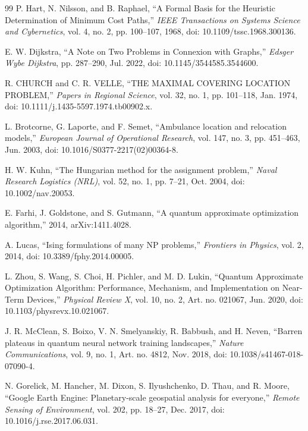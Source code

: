 \documentclass[10pt,twocolumn]{article}
\begin{document}
{\begin{thebibliography}{99}
P. Hart, N. Nilsson, and B. Raphael, ``A Formal Basis for the Heuristic Determination of Minimum Cost Paths,'' \emph{IEEE Transactions on Systems Science and Cybernetics}, vol. 4, no. 2, pp. 100--107, 1968, doi: 10.1109/tssc.1968.300136.

E. W. Dijkstra, ``A Note on Two Problems in Connexion with Graphs,'' \emph{Edsger Wybe Dijkstra}, pp. 287--290, Jul. 2022, doi: 10.1145/3544585.3544600.

R. CHURCH and C. R. VELLE, ``THE MAXIMAL COVERING LOCATION PROBLEM,'' \emph{Papers in Regional Science}, vol. 32, no. 1, pp. 101--118, Jan. 1974, doi: 10.1111/j.1435-5597.1974.tb00902.x.

L. Brotcorne, G. Laporte, and F. Semet, ``Ambulance location and relocation models,'' \emph{European Journal of Operational Research}, vol. 147, no. 3, pp. 451--463, Jun. 2003, doi: 10.1016/S0377-2217(02)00364-8.

H. W. Kuhn, ``The Hungarian method for the assignment problem,'' \emph{Naval Research Logistics (NRL)}, vol. 52, no. 1, pp. 7--21, Oct. 2004, doi: 10.1002/nav.20053.

E. Farhi, J. Goldstone, and S. Gutmann, ``A quantum approximate optimization algorithm,'' 2014, arXiv:1411.4028.

A. Lucas, ``Ising formulations of many NP problems,'' \emph{Frontiers in Physics}, vol. 2, 2014, doi: 10.3389/fphy.2014.00005.

L. Zhou, S. Wang, S. Choi, H. Pichler, and M. D. Lukin, ``Quantum Approximate Optimization Algorithm: Performance, Mechanism, and Implementation on Near-Term Devices,'' \emph{Physical Review X}, vol. 10, no. 2, Art. no. 021067, Jun. 2020, doi: 10.1103/physrevx.10.021067.

J. R. McClean, S. Boixo, V. N. Smelyanskiy, R. Babbush, and H. Neven, ``Barren plateaus in quantum neural network training landscapes,'' \emph{Nature Communications}, vol. 9, no. 1, Art. no. 4812, Nov. 2018, doi: 10.1038/s41467-018-07090-4.

N. Gorelick, M. Hancher, M. Dixon, S. Ilyushchenko, D. Thau, and R. Moore, ``Google Earth Engine: Planetary-scale geospatial analysis for everyone,'' \emph{Remote Sensing of Environment}, vol. 202, pp. 18--27, Dec. 2017, doi: 10.1016/j.rse.2017.06.031.


\end{thebibliography}}
\end{document}

